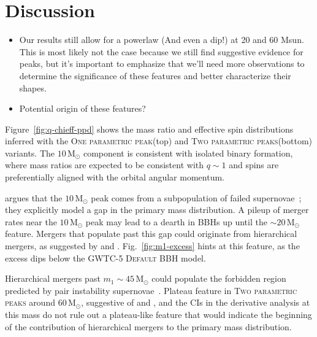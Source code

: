 \documentclass[twocolumn,twocolappendix,linenumbers]{aastex631}
\newcommand{\red}[1]{{\color{Red} #1}}
\newcommand{\PPMixture}{\textsc{PixelPop Mixture}\xspace}
\newcommand{\GwinfMixture}{\textsc{GWInferno Mixture}\xspace}
\newcommand{\oneparpeak}{\textsc{One parametric peak}\xspace}
\newcommand{\twoparpeaks}{\textsc{Two parametric peaks}\xspace}
\newcommand{\Msun}{\ensuremath{\mathrm{M}_\odot}\xspace}
\begin{document}

\section{Discussion}

\begin{itemize}
    \item Our results still allow for a powerlaw (And even a dip!) at 20 and 60 Msun. This is most likely not the case because we still find suggestive evidence for peaks, but it's important to emphasize that we'll need more observations to determine the significance of these features and better characterize their shapes.
    \item Potential origin of these features?
\end{itemize}

Figure~\ref{fig:q-chieff-ppd} shows the mass ratio and effective spin distributions inferred with the \oneparpeak (top) and \twoparpeaks (bottom) variants.
The \(10\,\Msun\) component is consistent with isolated binary formation, where mass ratios are expected to be consistent with \(q\sim1\) and spins are preferentially aligned with the orbital angular momentum.
 
\cite{Legred:2026oiz} argues that the \(10\,\Msun\) peak comes from a subpopulation of failed supernovae~\citep{Disberg:2023gel}; they explicitly model a gap in the primary mass distribution.
A pileup of \red{merger rates} near the \(10\,\Msun\) peak \red{may lead to} a dearth in BBHs up until the \(\sim20\,\Msun\) feature.
Mergers that populate past this gap could originate from hierarchical mergers, as suggested by \cite{Tong:2025xir} and \cite{Plunkett:2026pxt}.
Fig.~\ref{fig:m1-excess} hints at this feature, as the excess dips below the \ac{GWTC-5} \textsc{Default} \ac{BBH} model.

Hierarchical mergers past \(m_1\sim45\,\Msun\) could populate the forbidden region predicted by pair instability supernovae~\citep{Tong:2025wpz, Antonini:2025ilj}.
Plateau feature in \twoparpeaks around \(60\,\Msun\), suggestive of \cite{Antonini:2024het} and \cite{Antonini:2022vib}, and the CIs in the derivative analysis at this mass do not rule out a plateau-like feature that would indicate the \red{beginning of the contribution of} hierarchical mergers to the primary mass distribution.
\end{document}
